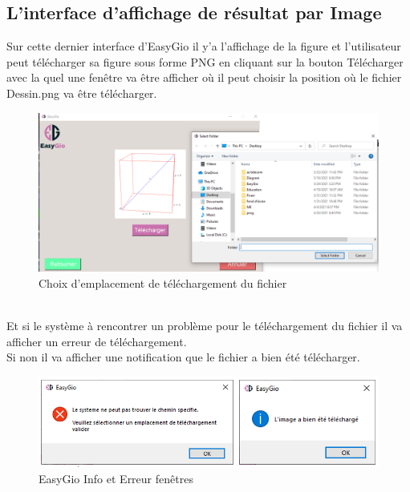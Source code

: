 \documentclass[a4paper]{report}
\begin{document}
\subsection{L'interface d'affichage de résultat par Image}
Sur cette dernier interface d'EasyGio il y'a l'affichage de la figure et l'utilisateur peut télécharger sa figure sous forme PNG en cliquant sur la bouton Télécharger avec la quel une fenêtre va être afficher où il peut choisir la position où le fichier Dessin.png va être télécharger.\\
\begin{figure}[!h]
    \centering
    \includegraphics[width=14cm]{images/CubeP.PNG}
    \caption{Choix d'emplacement de téléchargement du fichier}
    \label{fig:Choix d'emplacement de téléchargement du fichier}
\end{figure}\\
Et si le système à rencontrer un problème pour le téléchargement du fichier il va afficher un erreur de téléchargement.\\
Si non il va afficher une notification que le fichier a bien été télécharger.\\
\begin{figure}[!h]
    \centering
    \includegraphics[width=14cm]{images/nots.PNG}
    \caption{EasyGio Info et Erreur fenêtres}
    \label{fig:EasyGio Info et Erreur fenêtres}
\end{figure}
\end{document}
